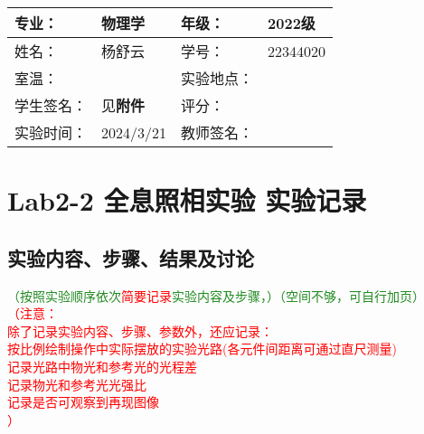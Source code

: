 \documentclass[dvipsnames, svgnames,a4paper,11pt]{article}
\begin{document}
	
	
	
	\clearpage
	
	\begin{table}
		\renewcommand\arraystretch{1.7}
		\centering
		\begin{tabularx}{\textwidth}{|X|X|X|X|}
			\hline
			专业： & 物理学 & 年级： & 2022级 \\
			\hline
			姓名： & 杨舒云 & 学号： & 22344020\\
			\hline
			室温： &  & 实验地点： &  \\
			\hline
			学生签名：& 见\textbf{附件} & 评分： &\\
			\hline
			实验时间：& 2024/3/21 & 教师签名：&\\
			\hline
		\end{tabularx}
	\end{table}
	\section{Lab2-2 全息照相实验  \quad\heiti 实验记录}
	\subsection{实验内容、步骤、结果及讨论}\textcolor{ForestGreen}{（按照实验顺序依次}\textcolor{red}{简要记录}\textcolor{ForestGreen}{实验内容及步骤，）（空间不够，可自行加页）}\\
	\textcolor{red}{
		（注意： \\
		除了记录实验内容、步骤、参数外，还应记录：\\
		按比例绘制操作中实际摆放的实验光路(各元件间距离可通过直尺测量)\\
		记录光路中物光和参考光的光程差\\
		记录物光和参考光光强比\\
		记录是否可观察到再现图像\\
		）
	}
	
	
	
	
	
	
	
	
	\clearpage
	
\end{document}

